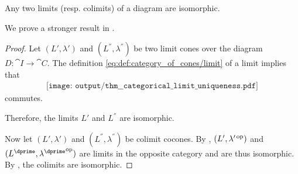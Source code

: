 \begin{lemma}\label{thm:categorical_limit_uniqueness_lemma}
  Any two limits (resp. colimits) of a diagram are isomorphic.

  We prove a stronger result in .
\end{lemma}
\begin{proof}
  Let \( (L', \lambda') \) and \( (L^\dprime, \lambda^\dprime) \) be two limit cones over the diagram \( D: \cat{I} \to \cat{C} \). The definition \eqref{eq:def:category_of_cones/limit} of a limit implies that
  \begin{equation}\label{eq:thm:categorical_limit_uniqueness}
    \begin{aligned}
      \texttt{[image: output/thm\_\_categorical\_limit\_uniqueness.pdf]}
    \end{aligned}
  \end{equation}
  commutes.

  Therefore, the limits \( L' \) and \( L^\dprime \) are isomorphic.

  Now let \( (L', \lambda') \) and \( (L^\dprime, \lambda^\dprime) \) be colimit cocones. By , \( (L', \lambda'^{\operatorname{op}}) \) and \( (L^\dprime, {\lambda^\dprime}^{\opcat}) \) are limits in the opposite category and are thus isomorphic. By , the colimits are isomorphic.
\end{proof}


